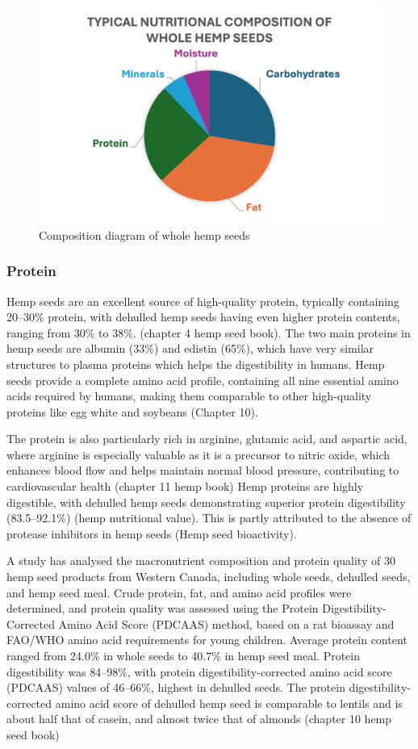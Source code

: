 \begin{figure}[H]
    \centering
    \includegraphics[width=0.75\linewidth]{Figures/fig_prod_concept_02.png}
    \caption{Composition diagram of whole hemp seeds}
    \label{fig:prod_concept_02}
\end{figure}

\subsubsection{Protein}
Hemp seeds are an excellent source of high-quality protein, typically containing 20–30\% protein, with dehulled hemp seeds having even higher protein contents, ranging from 30\% to 38\%. (chapter 4 hemp seed book). The two main proteins in hemp seeds are albumin (33\%) and edistin (65\%), which have very similar structures to plasma proteins which helps the digestibility in humans. Hemp seeds provide a complete amino acid profile, containing all nine essential amino acids required by humans, making them comparable to other high-quality proteins like egg white and soybeans (Chapter 10). 

\vspace{1em}
The protein is also particularly rich in arginine, glutamic acid, and aspartic acid, where arginine is especially valuable as it is a precursor to nitric oxide, which enhances blood flow and helps maintain normal blood pressure, contributing to cardiovascular health (chapter 11 hemp book)
Hemp proteins are highly digestible, with dehulled hemp seeds demonstrating superior protein digestibility (83.5–92.1\%) (hemp nutritional value). This is partly attributed to the absence of protease inhibitors in hemp seeds (Hemp seed bioactivity). 

\vspace{1em}
A study has analysed the macronutrient composition and protein quality of 30 hemp seed products from Western Canada, including whole seeds, dehulled seeds, and hemp seed meal. Crude protein, fat, and amino acid profiles were determined, and protein quality was assessed using the Protein Digestibility-Corrected Amino Acid Score (PDCAAS) method, based on a rat bioassay and FAO/WHO amino acid requirements for young children. Average protein content ranged from 24.0\% in whole seeds to 40.7\% in hemp seed meal. Protein digestibility was 84–98\%, with protein digestibility-corrected amino acid score (PDCAAS) values of 46–66\%, highest in dehulled seeds. The protein digestibility-corrected amino acid score of dehulled hemp seed is comparable to lentils and is about half that of casein, and almost twice that of almonds (chapter 10 hemp seed book)

